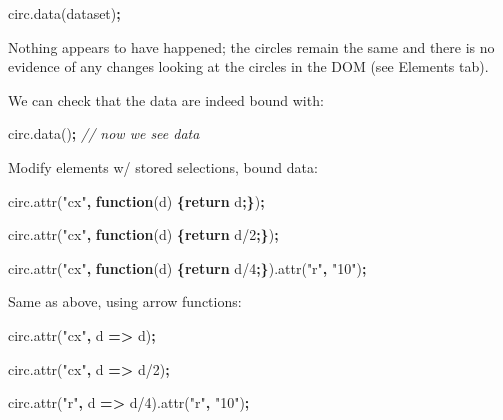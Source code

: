 \documentclass[openany]{book}
\newenvironment{Shaded}{\begin{snugshade}}{\end{snugshade}}
\newcommand{\AttributeTok}[1]{\textcolor[rgb]{0.77,0.63,0.00}{#1}}
\newcommand{\CommentTok}[1]{\textcolor[rgb]{0.56,0.35,0.01}{\textit{#1}}}
\newcommand{\ControlFlowTok}[1]{\textcolor[rgb]{0.13,0.29,0.53}{\textbf{#1}}}
\newcommand{\DecValTok}[1]{\textcolor[rgb]{0.00,0.00,0.81}{#1}}
\newcommand{\KeywordTok}[1]{\textcolor[rgb]{0.13,0.29,0.53}{\textbf{#1}}}
\newcommand{\NormalTok}[1]{#1}
\newcommand{\OperatorTok}[1]{\textcolor[rgb]{0.81,0.36,0.00}{\textbf{#1}}}
\newcommand{\StringTok}[1]{\textcolor[rgb]{0.31,0.60,0.02}{#1}}
\newcommand{\VariableTok}[1]{\textcolor[rgb]{0.00,0.00,0.00}{#1}}
\begin{document}
\begin{Shaded}
\begin{Highlighting}[]
\VariableTok{circ}\NormalTok{.}\AttributeTok{data}\NormalTok{(dataset)}\OperatorTok{;}
\end{Highlighting}
\end{Shaded}

Nothing appears to have happened; the circles remain the same and there is no evidence of any changes looking at the circles in the DOM (see Elements tab).

We can check that the data are indeed bound with:

\begin{Shaded}
\begin{Highlighting}[]
\VariableTok{circ}\NormalTok{.}\AttributeTok{data}\NormalTok{()}\OperatorTok{;}  \CommentTok{// now we see data}
\end{Highlighting}
\end{Shaded}

Modify elements w/ stored selections, bound data:

\begin{Shaded}
\begin{Highlighting}[]
\VariableTok{circ}\NormalTok{.}\AttributeTok{attr}\NormalTok{(}\StringTok{"cx"}\OperatorTok{,} \KeywordTok{function}\NormalTok{(d) }\OperatorTok{\{}\ControlFlowTok{return}\NormalTok{ d}\OperatorTok{;\}}\NormalTok{)}\OperatorTok{;}

\VariableTok{circ}\NormalTok{.}\AttributeTok{attr}\NormalTok{(}\StringTok{"cx"}\OperatorTok{,} \KeywordTok{function}\NormalTok{(d) }\OperatorTok{\{}\ControlFlowTok{return}\NormalTok{ d/}\DecValTok{2}\OperatorTok{;\}}\NormalTok{)}\OperatorTok{;}

\VariableTok{circ}\NormalTok{.}\AttributeTok{attr}\NormalTok{(}\StringTok{"cx"}\OperatorTok{,} \KeywordTok{function}\NormalTok{(d) }\OperatorTok{\{}\ControlFlowTok{return}\NormalTok{ d/}\DecValTok{4}\OperatorTok{;\}}\NormalTok{).}\AttributeTok{attr}\NormalTok{(}\StringTok{"r"}\OperatorTok{,} \StringTok{"10"}\NormalTok{)}\OperatorTok{;}
\end{Highlighting}
\end{Shaded}

Same as above, using arrow functions:

\begin{Shaded}
\begin{Highlighting}[]
\VariableTok{circ}\NormalTok{.}\AttributeTok{attr}\NormalTok{(}\StringTok{"cx"}\OperatorTok{,}\NormalTok{ d }\OperatorTok{=>}\NormalTok{ d)}\OperatorTok{;}

\VariableTok{circ}\NormalTok{.}\AttributeTok{attr}\NormalTok{(}\StringTok{"cx"}\OperatorTok{,}\NormalTok{ d }\OperatorTok{=>}\NormalTok{ d/}\DecValTok{2}\NormalTok{)}\OperatorTok{;}

\VariableTok{circ}\NormalTok{.}\AttributeTok{attr}\NormalTok{(}\StringTok{"r"}\OperatorTok{,}\NormalTok{ d }\OperatorTok{=>}\NormalTok{ d/}\DecValTok{4}\NormalTok{).}\AttributeTok{attr}\NormalTok{(}\StringTok{"r"}\OperatorTok{,} \StringTok{"10"}\NormalTok{)}\OperatorTok{;}
\end{Highlighting}
\end{Shaded}
\end{document}

